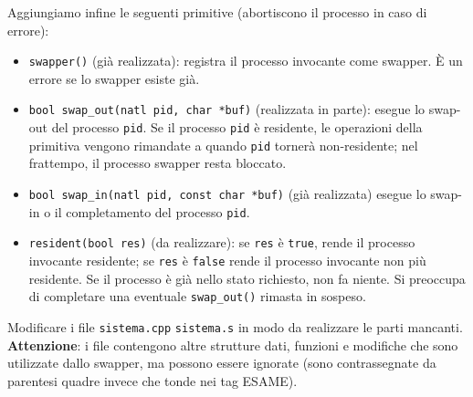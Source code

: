 Aggiungiamo infine le seguenti primitive (abortiscono il processo
in caso di errore):
\begin{itemize}
 \item \verb|swapper()| (gi\`a realizzata): registra il processo invocante come
  swapper. \`E un errore se lo swapper esiste gi\`a.
 \item \verb|bool swap_out(natl pid, char *buf)| (realizzata in parte):
  esegue lo swap-out del processo \verb|pid|. Se il processo \verb|pid|
  \`e residente, le operazioni della primitiva vengono rimandate
  a quando \verb|pid| torner\`a non-residente; nel frattempo, il processo
  swapper resta bloccato.
 \item \verb|bool swap_in(natl pid, const char *buf)| (gi\`a realizzata)
 esegue lo swap-in o il completamento del processo \verb|pid|.
 \item \verb|resident(bool res)| (da realizzare): se \verb|res| \`e \verb|true|,
 rende il processo invocante residente; se \verb|res| \`e \verb|false| rende
 il processo invocante non pi\`u residente. Se il processo \`e gi\`a nello stato
 richiesto, non fa niente. Si preoccupa di completare una eventuale
 \verb|swap_out()| rimasta in sospeso.
\end{itemize}
Modificare i file \verb|sistema.cpp| \verb|sistema.s| in modo da realizzare le parti mancanti.
{\bf Attenzione}: i file contengono altre strutture dati, funzioni e modifiche che
sono utilizzate dallo swapper, ma possono essere ignorate (sono contrassegnate da parentesi
quadre invece che tonde nei tag ESAME).

